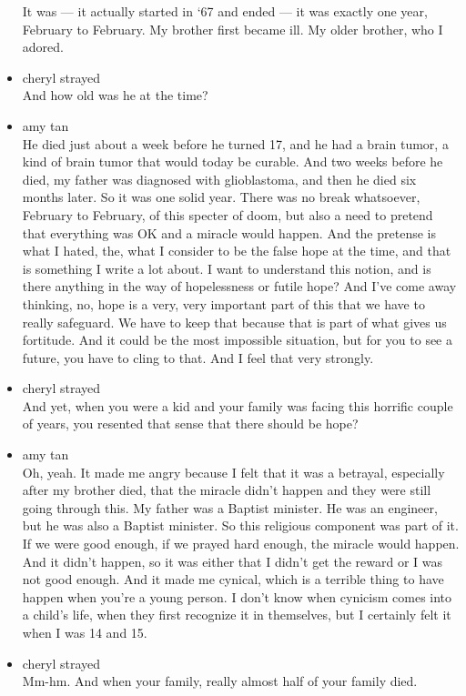 \begin{itemize}
  It was --- it actually started in `67 and ended --- it was exactly one
  year, February to February. My brother first became ill. My older
  brother, who I adored.
\item
  cheryl strayed\\
  And how old was he at the time?
\item
  amy tan\\
  He died just about a week before he turned 17, and he had a brain
  tumor, a kind of brain tumor that would today be curable. And two
  weeks before he died, my father was diagnosed with glioblastoma, and
  then he died six months later. So it was one solid year. There was no
  break whatsoever, February to February, of this specter of doom, but
  also a need to pretend that everything was OK and a miracle would
  happen. And the pretense is what I hated, the, what I consider to be
  the false hope at the time, and that is something I write a lot about.
  I want to understand this notion, and is there anything in the way of
  hopelessness or futile hope? And I've come away thinking, no, hope is
  a very, very important part of this that we have to really safeguard.
  We have to keep that because that is part of what gives us fortitude.
  And it could be the most impossible situation, but for you to see a
  future, you have to cling to that. And I feel that very strongly.
\item
  cheryl strayed\\
  And yet, when you were a kid and your family was facing this horrific
  couple of years, you resented that sense that there should be hope?
\item
  amy tan\\
  Oh, yeah. It made me angry because I felt that it was a betrayal,
  especially after my brother died, that the miracle didn't happen and
  they were still going through this. My father was a Baptist minister.
  He was an engineer, but he was also a Baptist minister. So this
  religious component was part of it. If we were good enough, if we
  prayed hard enough, the miracle would happen. And it didn't happen, so
  it was either that I didn't get the reward or I was not good enough.
  And it made me cynical, which is a terrible thing to have happen when
  you're a young person. I don't know when cynicism comes into a child's
  life, when they first recognize it in themselves, but I certainly felt
  it when I was 14 and 15.
\item
  cheryl strayed\\
  Mm-hm. And when your family, really almost half of your family died.

\end{itemize}

